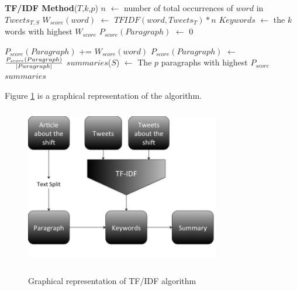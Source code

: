 \begin{algorithmic}
\STATE \textbf{TF/IDF Method}($T$,$k$,$p$)
\STATE
{}
		\STATE $n$ $\leftarrow$ number of total occurrences of $word$ in $Tweets_{T,S}$
		\STATE $W_{score}(word)$ $\leftarrow$ $TFIDF(word,Tweets_T) * n$
	\ENDFOR
	\STATE
	\STATE $Keywords$ $\leftarrow$ the $k$ words with highest $W_{score}$
	\STATE
			\STATE $P_{score}(Paragraph)$ $\leftarrow$ $0$

					\STATE $P_{score}(Paragraph)$ += $W_{score}(word)$
				\ENDIF
			\ENDFOR
			\STATE $P_{score}(Paragraph)$ $\leftarrow$ ${P_{score}(Paragraph) \over |Paragraph|}$
		\ENDFOR
	\ENDFOR
	\STATE
	\STATE $summaries$($S$) $\leftarrow$ The $p$ paragraphs with highest $P_{score}$
\ENDFOR
\STATE
\RETURN $summaries$

Figure \ref{fig:TFIDF} is a graphical representation of the algorithm.

\begin{figure}[htbp]
	\centering
			{\includegraphics[width=8.5cm,height=7cm]{image/TF-IDF.jpg}}	
		\caption[TFIDF]{Graphical representation of TF/IDF algorithm}
	\label{fig:TFIDF}
\end{figure} 

\end{algorithmic}
